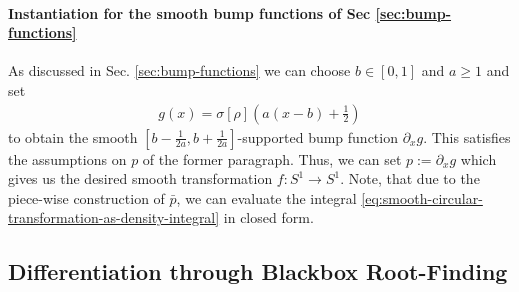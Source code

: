 \documentclass{article}
\begin{document}
\paragraph{Instantiation for the smooth bump functions of Sec \ref{sec:bump-functions}}

As discussed in Sec. \ref{sec:bump-functions} we can choose $b \in [0,1]$ and $a \geq 1$ and set
\begin{align}
    g(x) = \sigma[\rho]\left(a (x - b) + \tfrac{1}{2}\right)
\end{align}
to obtain the smooth $[b - \tfrac{1}{2a}, b + \tfrac{1}{2a}]$-supported bump function $\partial_{x} g$. This satisfies the assumptions on $p$ of the former paragraph. Thus, we can set $p := \partial_{x} g$ which gives us the desired smooth transformation $f \colon S^1 \rightarrow S^1$. Note, that due to the piece-wise construction of $\bar p$, we can evaluate the integral \eqref{eq:smooth-circular-transformation-as-density-integral} in closed form.

\subsection{Differentiation through Blackbox Root-Finding}
\end{document}
